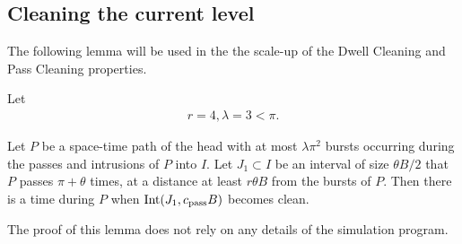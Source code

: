 \documentclass[11pt]{memoir}
\theoremstyle{definition} %
\def\B{B}
\newcommand{\Int}{\mathrm{Int}}
\newcommand{\passno}{\pi}
\newcommand{\cns}[1]{c_{\textrm{\upshape #1}}}
\newcommand{\CPass}{\cns{pass}}
\renewcommand{\r}{r} %
\begin{document}
\subsection{Cleaning the current level}

The following lemma will be used in the the scale-up of the Dwell Cleaning and Pass Cleaning properties.

Let
\begin{align}\label{eq:r-def}
  \r = 4,
  \lambda = 3<\passno.
\end{align}

\begin{lemma}\label{lem:pass-clean-1}
  Let \( P \) be a space-time path of the head  with at most \( \lambda\passno^{2} \) bursts
  occurring during the passes and intrusions of \( P \) into \( I \).
  Let \( J_{1}\subset I \) be an interval of size \( \theta\B/2 \) that \( P \)
  passes \( \passno+\theta \) times,
  at a distance at least \( \r\theta\B \) from the bursts of \( P \).
  Then there is a time during \( P \) when \( \Int(J_{1},\CPass\B) \) becomes clean.
\end{lemma}
The proof of this lemma does not rely on any details of the simulation program.
\end{document}
